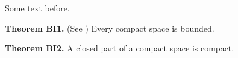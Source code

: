 \documentclass{article}
\begin{document}
Some text before.

\textbf{Theorem BI1.} (See \cite{ref}) Every compact space is bounded.

\textbf{Theorem BI2.} A closed part of a compact space is compact.
\end{document}
